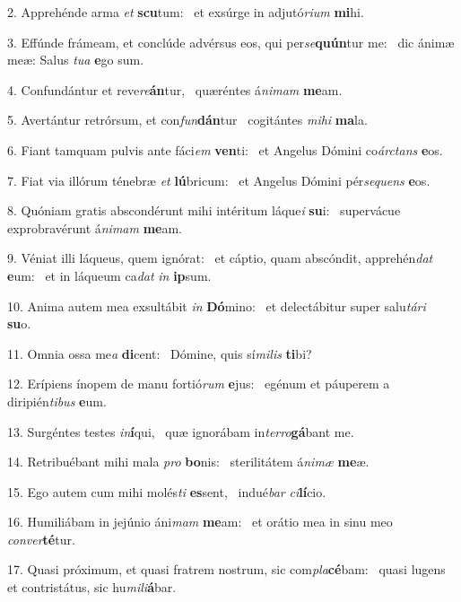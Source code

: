 2. Apprehénde arma \textit{et} \textbf{scu}tum: \ast\  et exsúrge in adjutó\textit{ri}\textit{um} \textbf{mi}hi.\

3. Effúnde frámeam, et conclúde advérsus eos, qui per\textit{se}\textbf{quún}tur me: \ast\  dic ánimæ meæ: Salus \textit{tu}\textit{a} \textbf{e}go sum.\

4. Confundántur et reve\textit{re}\textbf{án}tur, \ast\  quæréntes á\textit{ni}\textit{mam} \textbf{me}am.\

5. Avertántur retrórsum, et con\textit{fun}\textbf{dán}tur \ast\  cogitántes \textit{mi}\textit{hi} \textbf{ma}la.\

6. Fiant tamquam pulvis ante fáci\textit{em} \textbf{ven}ti: \ast\  et Angelus Dómini co\textit{árc}\textit{tans} \textbf{e}os.\

7. Fiat via illórum ténebræ \textit{et} \textbf{lú}bricum: \ast\  et Angelus Dómini pér\textit{se}\textit{quens} \textbf{e}os.\

8. Quóniam gratis abscondérunt mihi intéritum láque\textit{i} \textbf{su}i: \ast\  supervácue exprobravérunt á\textit{ni}\textit{mam} \textbf{me}am.\

9. Véniat illi láqueus, quem ignórat: \dag\  et cáptio, quam abscóndit, apprehén\textit{dat} \textbf{e}um: \ast\  et in láqueum ca\textit{dat} \textit{in} \textbf{ip}sum.\

10. Anima autem mea exsultábit \textit{in} \textbf{Dó}mino: \ast\  et delectábitur super salu\textit{tá}\textit{ri} \textbf{su}o.\

11. Omnia ossa me\textit{a} \textbf{di}cent: \ast\  Dómine, quis sí\textit{mi}\textit{lis} \textbf{ti}bi?\

12. Erípiens ínopem de manu fortió\textit{rum} \textbf{e}jus: \ast\  egénum et páuperem a diripién\textit{ti}\textit{bus} \textbf{e}um.\

13. Surgéntes testes \textit{in}\textbf{í}qui, \ast\  quæ ignorábam in\textit{ter}\textit{ro}\textbf{gá}bant me.\

14. Retribuébant mihi mala \textit{pro} \textbf{bo}nis: \ast\  sterilitátem á\textit{ni}\textit{mæ} \textbf{me}æ.\

15. Ego autem cum mihi molés\textit{ti} \textbf{es}sent, \ast\  indué\textit{bar} \textit{ci}\textbf{lí}cio.\

16. Humiliábam in jejúnio áni\textit{mam} \textbf{me}am: \ast\  et orátio mea in sinu meo \textit{con}\textit{ver}\textbf{té}tur.\

17. Quasi próximum, et quasi fratrem nostrum, sic com\textit{pla}\textbf{cé}bam: \ast\  quasi lugens et contristátus, sic hu\textit{mi}\textit{li}\textbf{á}bar.\

